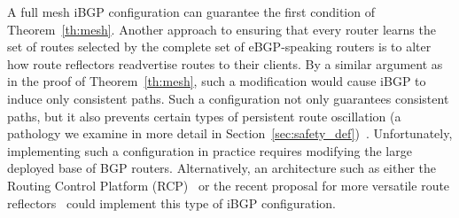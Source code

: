 A full mesh iBGP configuration can guarantee the first condition of
Theorem~\ref{th:mesh}.  Another approach to ensuring that every router
learns the set of routes selected by the complete set of eBGP-speaking
routers is to alter how route reflectors readvertise routes to their
clients.  By a similar argument as in the proof of
Theorem~\ref{th:mesh}, such a modification would cause iBGP to induce
only consistent paths.  Such a configuration not only guarantees
consistent paths, but it also prevents certain types of persistent route
oscillation (a pathology we examine in more detail in
Section~\ref{sec:safety_def})~\cite{Basu2002}. Unfortunately,
implementing such a configuration in practice requires modifying the
large deployed base of BGP routers.  Alternatively, an architecture such
as either the Routing Control Platform
(RCP)~\cite{caesar2004,feamster:fdna2004} or the recent proposal for
more versatile route reflectors~\cite{id-versatile-rr} could implement
this type of iBGP configuration.










